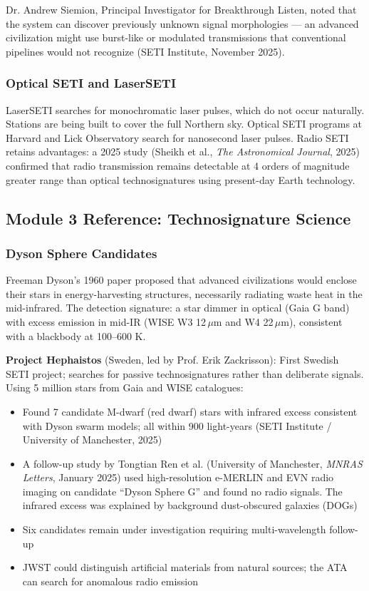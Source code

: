\documentclass[11pt,letterpaper]{article}
\begin{document}
Dr. Andrew Siemion, Principal Investigator for Breakthrough Listen, noted that the system can discover previously unknown signal morphologies --- an advanced civilization might use burst-like or modulated transmissions that conventional pipelines would not recognize (SETI Institute, November 2025).

\subsubsection{Optical SETI and LaserSETI}

LaserSETI searches for monochromatic laser pulses, which do not occur naturally. Stations are being built to cover the full Northern sky. Optical SETI programs at Harvard and Lick Observatory search for nanosecond laser pulses. Radio SETI retains advantages: a 2025 study (Sheikh et al., \textit{The Astronomical Journal}, 2025) confirmed that radio transmission remains detectable at 4 orders of magnitude greater range than optical technosignatures using present-day Earth technology.

\subsection{Module 3 Reference: Technosignature Science}

\subsubsection{Dyson Sphere Candidates}

Freeman Dyson's 1960 paper proposed that advanced civilizations would enclose their stars in energy-harvesting structures, necessarily radiating waste heat in the mid-infrared. The detection signature: a star dimmer in optical (Gaia G band) with excess emission in mid-IR (WISE W3 12\,$\mu$m and W4 22\,$\mu$m), consistent with a blackbody at 100--600 K.

\textbf{Project Hephaistos} (Sweden, led by Prof. Erik Zackrisson): First Swedish SETI project; searches for passive technosignatures rather than deliberate signals. Using 5 million stars from Gaia and WISE catalogues:

\begin{itemize}[leftmargin=1.5em]
  \item Found 7 candidate M-dwarf (red dwarf) stars with infrared excess consistent with Dyson swarm models; all within 900 light-years (SETI Institute / University of Manchester, 2025)
  \item A follow-up study by Tongtian Ren et al. (University of Manchester, \textit{MNRAS Letters}, January 2025) used high-resolution e-MERLIN and EVN radio imaging on candidate ``Dyson Sphere G'' and found no radio signals. The infrared excess was explained by background dust-obscured galaxies (DOGs)
  \item Six candidates remain under investigation requiring multi-wavelength follow-up
  \item JWST could distinguish artificial materials from natural sources; the ATA can search for anomalous radio emission
\end{itemize}
\end{document}
